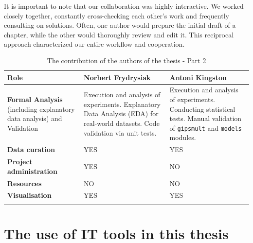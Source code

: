 \documentclass[a4paper,11pt,twoside]{report}
\theoremstyle{definition}
\begin{document}
\noindent
It is important to note that our collaboration was highly interactive. We worked closely together, constantly cross-checking each other's work and frequently consulting on solutions. Often, one author would prepare the initial draft of a chapter, while the other would thoroughly review and edit it. This reciprocal approach characterized our entire workflow and cooperation.

\begin{table}[H]
    \centering
    \small
    \renewcommand{\arraystretch}{1.5}
    \begin{tabularx}{\textwidth}{ >{\raggedright\arraybackslash}p{6cm} X X }
        \toprule
        \textbf{Role} & \textbf{Norbert Frydrysiak} \newline 327273 & \textbf{Antoni Kingston} \newline 327284 \\
        \midrule
        \textbf{Formal Analysis} \newline
        (including explanatory data analysis) and Validation &
        Execution and analysis of experiments. \newline
        Explanatory Data Analysis (EDA) for real-world datasets. \newline
        Code validation via unit tests. &
        Execution and analysis of experiments. \newline
        Conducting statistical tests. \newline
        Manual validation of \texttt{gipsmult} and \texttt{models} modules. \\
        \addlinespace[10pt]
        \textbf{Data curation} &
        YES &
        YES \\
        \addlinespace[10pt]
        \textbf{Project administration} &
        YES &
        NO \\
        \addlinespace[10pt]
        \textbf{Resources} &
        NO &
        NO \\
        \addlinespace[10pt]
        \textbf{Visualisation} &
        YES &
        YES \\
        \addlinespace[10pt]
        \bottomrule
    \end{tabularx}
    \caption{The contribution of the authors of the thesis - Part 2}
\end{table}

\section*{The use of IT tools in this thesis}
\vspace{3pt}
\end{document}
